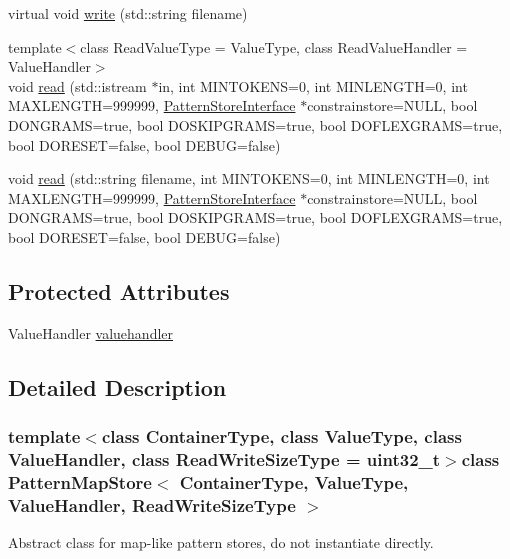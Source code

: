 \begin{DoxyCompactItemize}
\item 
virtual void \hyperlink{classPatternMapStore_abefd53c729c5cdd4916edfc8be1054b2}{write} (std\+::string filename)
\item 
{\footnotesize template$<$class Read\+Value\+Type  = Value\+Type, class Read\+Value\+Handler  = Value\+Handler$>$ }\\void \hyperlink{classPatternMapStore_af6b2ea5515c974d47212bd84b0d39f15}{read} (std\+::istream $\ast$in, int M\+I\+N\+T\+O\+K\+E\+N\+S=0, int M\+I\+N\+L\+E\+N\+G\+T\+H=0, int M\+A\+X\+L\+E\+N\+G\+T\+H=999999, \hyperlink{classPatternStoreInterface}{Pattern\+Store\+Interface} $\ast$constrainstore=N\+U\+L\+L, bool D\+O\+N\+G\+R\+A\+M\+S=true, bool D\+O\+S\+K\+I\+P\+G\+R\+A\+M\+S=true, bool D\+O\+F\+L\+E\+X\+G\+R\+A\+M\+S=true, bool D\+O\+R\+E\+S\+E\+T=false, bool D\+E\+B\+U\+G=false)
\item 
void \hyperlink{classPatternMapStore_af105b594e52f6f730cc5b15d10f145fe}{read} (std\+::string filename, int M\+I\+N\+T\+O\+K\+E\+N\+S=0, int M\+I\+N\+L\+E\+N\+G\+T\+H=0, int M\+A\+X\+L\+E\+N\+G\+T\+H=999999, \hyperlink{classPatternStoreInterface}{Pattern\+Store\+Interface} $\ast$constrainstore=N\+U\+L\+L, bool D\+O\+N\+G\+R\+A\+M\+S=true, bool D\+O\+S\+K\+I\+P\+G\+R\+A\+M\+S=true, bool D\+O\+F\+L\+E\+X\+G\+R\+A\+M\+S=true, bool D\+O\+R\+E\+S\+E\+T=false, bool D\+E\+B\+U\+G=false)
\end{DoxyCompactItemize}
\subsection*{Protected Attributes}
\begin{DoxyCompactItemize}
\item 
Value\+Handler \hyperlink{classPatternMapStore_abdbe9beb478e1719f6edb64272424e5f}{valuehandler}
\end{DoxyCompactItemize}


\subsection{Detailed Description}
\subsubsection*{template$<$class Container\+Type, class Value\+Type, class Value\+Handler, class Read\+Write\+Size\+Type = uint32\+\_\+t$>$class Pattern\+Map\+Store$<$ Container\+Type, Value\+Type, Value\+Handler, Read\+Write\+Size\+Type $>$}

Abstract class for map-\/like pattern stores, do not instantiate directly. 


